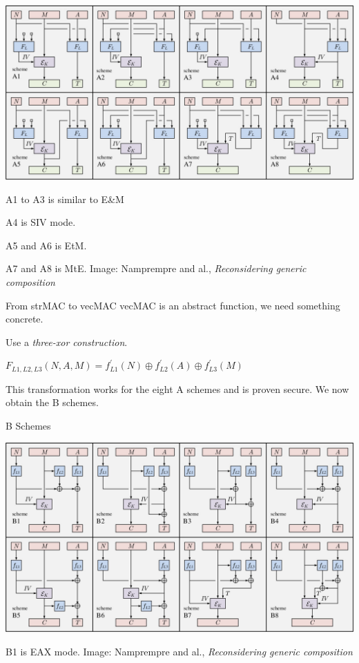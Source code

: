 \documentclass[11pt]{beamer}
\begin{document}
\begin{frame}
\begin{center}
\includegraphics[scale=0.22]{../report/vecmac.jpg}
\end{center}

A1 to A3 is similar to E\&M

A4 is SIV mode.

A5 and A6 is EtM.

A7 and A8 is MtE.
\vfill
{\tiny Image: Namprempre and al., \emph{Reconsidering generic composition}}
\end{frame}

\begin{frame}{From strMAC to vecMAC}
vecMAC is an abstract function, we need something concrete.

Use a \emph{three-xor construction}.

\begin{center}
$F_{L1,L2,L3}(N,A,M) = f^\prime_{L1}(N) \oplus f^\prime_{L2}(A) \oplus f^\prime_{L3}(M)$
\end{center}

This transformation works for the eight A schemes and is proven secure.
We now obtain the B schemes.
\end{frame}

\begin{frame}{B Schemes}
\begin{center}
\includegraphics[scale=0.22]{../report/strmac.jpg}
\end{center}

B1 is EAX mode.
\vfill
{\tiny Image: Namprempre and al., \emph{Reconsidering generic composition}}
\end{frame}
\end{document}
